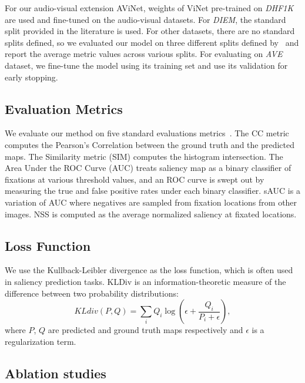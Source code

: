 \documentclass[letterpaper, 10 pt, conference]{ieeeconf}  \usepackage{times}
\begin{document}
For our audio-visual extension AViNet, weights of ViNet pre-trained on \emph{DHF1K} are used and fine-tuned on the audio-visual datasets. For \emph{DIEM}, the standard split provided in the literature is used. For other datasets, there are no standard splits defined, so we evaluated our model on three different splits defined by~\cite{tsiami2020stavis} and report the average metric values across various splits. For evaluating on \emph{AVE} dataset, we fine-tune the model using its training set and use its validation for early stopping.



\subsection{Evaluation Metrics}
 We evaluate our method on five standard evaluations metrics~\cite{bylinskii2018different}. The CC metric computes the Pearson’s Correlation between the ground truth and the predicted maps. The Similarity metric (SIM) computes the histogram intersection. The Area Under the ROC Curve (AUC) treats saliency map as a binary classifier of fixations at various threshold values, and an ROC curve is swept out by measuring the true and false positive rates under each binary classifier. sAUC is a variation of AUC where negatives are sampled from fixation locations from other images. NSS is computed as the average normalized saliency at fixated locations.


\subsection{Loss Function}
We use the Kullback-Leibler divergence as the loss function, which is often used in saliency prediction tasks. KLDiv is an information-theoretic measure of the difference between two probability distributions:
\begin{equation}
    KLdiv(P,Q) = \sum_{i} Q_{i}\log(\epsilon + \frac{Q_{i}}{P_{i} + \epsilon} ),
\end{equation}
where $P$, $Q$ are predicted and ground truth maps respectively and $\epsilon$ is a regularization term. 

\subsection{Ablation studies}
\end{document}
